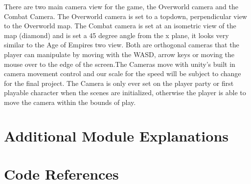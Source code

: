 \documentclass[12pt, titlepage]{article}
\begin{document}
\begin{enumerate}
	There are two main camera view for the game, the Overworld camera and the Combat Camera. The Overworld camera is set to a topdown, perpendicular view to the Overworld map. The Combat camera is set at an isometric view of the map (diamond) and is set a 45 degree angle from the x plane, it looks very similar to the Age of Empires two view. Both are orthogonal cameras that the player can manipulate by moving with the WASD, arrow keys or moving the mouse over to the edge of the screen.The Cameras move with unity's built in camera movement control and our scale for the speed will be subject to change for the final project.  The Camera is only ever set on the player party or first playable character when the scenes are initialized, otherwise the player is able to move the camera within the bounds of play. 
\end{enumerate}

\section{Additional Module Explanations}




\section{Code References}
\end{document}
